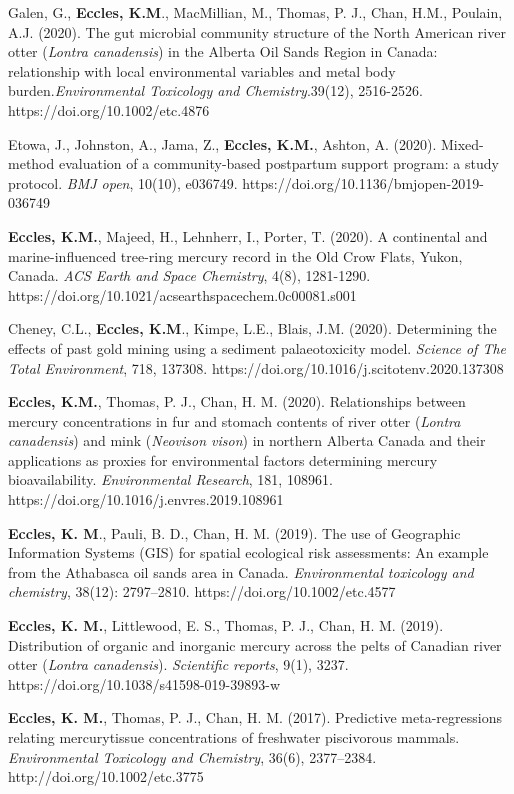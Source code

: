 \documentclass[margin,line]{res}
\begin{document}
\begin{resume}
Galen, G., \textbf{Eccles, K.M}., MacMillian, M., Thomas, P. J., Chan, H.M., Poulain, A.J. (2020). The gut microbial community structure of the North American river otter (\textit{Lontra canadensis}) in the Alberta Oil Sands Region in Canada: relationship with local environmental variables and metal body burden.\textit{Environmental Toxicology and Chemistry}.39(12), 2516-2526. https://doi.org/10.1002/etc.4876

Etowa, J., Johnston, A., Jama, Z., \textbf{Eccles, K.M.}, Ashton, A. (2020). Mixed-method evaluation of a community-based postpartum support program: a study protocol. \textit{BMJ open}, 10(10), e036749. https://doi.org/10.1136/bmjopen-2019-036749

\textbf{Eccles, K.M.}, Majeed, H., Lehnherr, I., Porter, T. (2020). A continental and marine-influenced tree-ring mercury record in the Old Crow Flats, Yukon, Canada. \textit{ACS Earth and Space Chemistry}, 4(8), 1281-1290. https://doi.org/10.1021/acsearthspacechem.0c00081.s001

Cheney, C.L., \textbf{Eccles, K.M}., Kimpe, L.E., Blais, J.M. (2020). Determining the effects of past gold mining using a sediment palaeotoxicity model. \textit{Science of The Total Environment}, 718, 137308. https://doi.org/10.1016/j.scitotenv.2020.137308

\textbf{Eccles, K.M.}, Thomas, P. J., Chan, H. M. (2020). Relationships between mercury concentrations in fur and stomach contents of river otter (\textit{Lontra canadensis}) and mink (\textit{Neovison vison}) in northern Alberta Canada and their applications as proxies for environmental factors determining mercury bioavailability. \textit{Environmental Research}, 181, 108961. https://doi.org/10.1016/j.envres.2019.108961

\textbf{Eccles, K. M}., Pauli, B. D., Chan, H. M. (2019). The use of Geographic Information Systems (GIS) for spatial ecological risk assessments: An example from the Athabasca oil sands area in Canada. \textit{Environmental toxicology and chemistry}, 38(12): 2797–2810. https://doi.org/10.1002/etc.4577

\textbf{Eccles, K. M.}, Littlewood, E. S., Thomas, P. J., Chan, H. M. (2019). Distribution of organic and inorganic mercury across the pelts of Canadian river otter (\textit{Lontra canadensis}). \textit{Scientific reports}, 9(1), 3237. https://doi.org/10.1038/s41598-019-39893-w

\textbf{Eccles, K. M.}, Thomas, P. J., Chan, H. M. (2017). Predictive meta-regressions relating mercurytissue concentrations of freshwater piscivorous mammals. \textit{Environmental Toxicology and Chemistry}, 36(6), 2377–2384. http://doi.org/10.1002/etc.3775


\end{resume}
\end{document}
